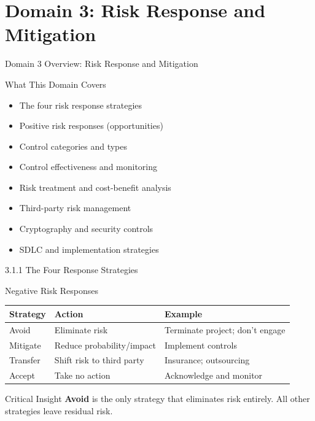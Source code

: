 \documentclass{beamer}
\begin{document}
	
	\section{Domain 3: Risk Response and Mitigation}
	
	\begin{frame}{Domain 3 Overview: Risk Response and Mitigation}
		\begin{block}{What This Domain Covers}
			\begin{itemize}
				\item The four risk response strategies
				\item Positive risk responses (opportunities)
				\item Control categories and types
				\item Control effectiveness and monitoring
				\item Risk treatment and cost-benefit analysis
				\item Third-party risk management
				\item Cryptography and security controls
				\item SDLC and implementation strategies
			\end{itemize}
		\end{block}
	\end{frame}
	
	\begin{frame}{3.1.1 The Four Response Strategies}
		\begin{block}{Negative Risk Responses}
			\begin{tabular}{|p{2.5cm}|p{4cm}|p{5cm}|}
				\hline
				\textbf{Strategy} & \textbf{Action} & \textbf{Example} \\
				\hline
				Avoid & Eliminate risk & Terminate project; don't engage \\
				\hline
				Mitigate & Reduce probability/impact & Implement controls \\
				\hline
				Transfer & Shift risk to third party & Insurance; outsourcing \\
				\hline
				Accept & Take no action & Acknowledge and monitor \\
				\hline
			\end{tabular}
		\end{block}
		\begin{alertblock}{Critical Insight}
			\textbf{Avoid} is the only strategy that eliminates risk entirely. All other strategies leave residual risk.
		\end{alertblock}
	\end{frame}
	
\end{document}
